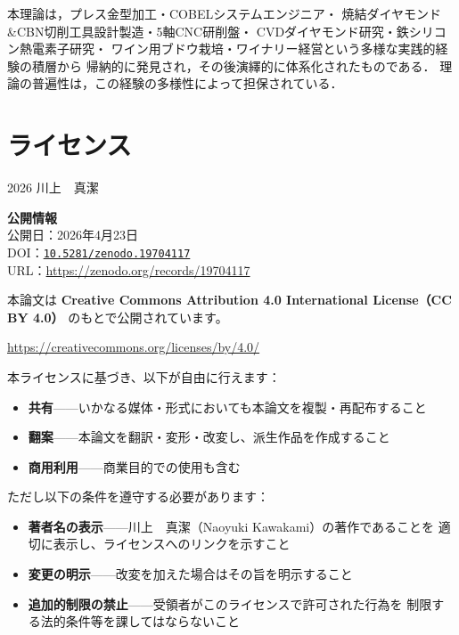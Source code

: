 \documentclass[12pt, a4paper]{article}
\theoremstyle{definition}
\begin{document}
\noindent
本理論は，プレス金型加工・COBELシステムエンジニア・
焼結ダイヤモンド\&CBN切削工具設計製造・5軸CNC研削盤・
CVDダイヤモンド研究・鉄シリコン熱電素子研究・
ワイン用ブドウ栽培・ワイナリー経営という多様な実践的経験の積層から
帰納的に発見され，その後演繹的に体系化されたものである．
理論の普遍性は，この経験の多様性によって担保されている．

\section*{ライセンス}

\noindent
\textcopyright{} 2026 川上　真潔

\vspace{0.5em}
\noindent
\textbf{公開情報}\\
公開日：2026年4月23日\\
DOI：\href{https://doi.org/10.5281/zenodo.19704117}{\texttt{10.5281/zenodo.19704117}}\\
URL：\url{https://zenodo.org/records/19704117}

\vspace{0.5em}
\noindent
本論文は
\textbf{Creative Commons Attribution 4.0 International License（CC BY 4.0）}
のもとで公開されています。

\vspace{0.5em}
\noindent
\url{https://creativecommons.org/licenses/by/4.0/}

\vspace{0.8em}
\noindent
本ライセンスに基づき、以下が自由に行えます：

\begin{itemize}
  \item \textbf{共有}——いかなる媒体・形式においても本論文を複製・再配布すること
  \item \textbf{翻案}——本論文を翻訳・変形・改変し、派生作品を作成すること
  \item \textbf{商用利用}——商業目的での使用も含む
\end{itemize}

\vspace{0.5em}
\noindent
ただし以下の条件を遵守する必要があります：

\begin{itemize}
  \item \textbf{著者名の表示}——川上　真潔（Naoyuki Kawakami）の著作であることを
        適切に表示し、ライセンスへのリンクを示すこと
  \item \textbf{変更の明示}——改変を加えた場合はその旨を明示すること
  \item \textbf{追加的制限の禁止}——受領者がこのライセンスで許可された行為を
        制限する法的条件等を課してはならないこと
\end{itemize}
\end{document}
